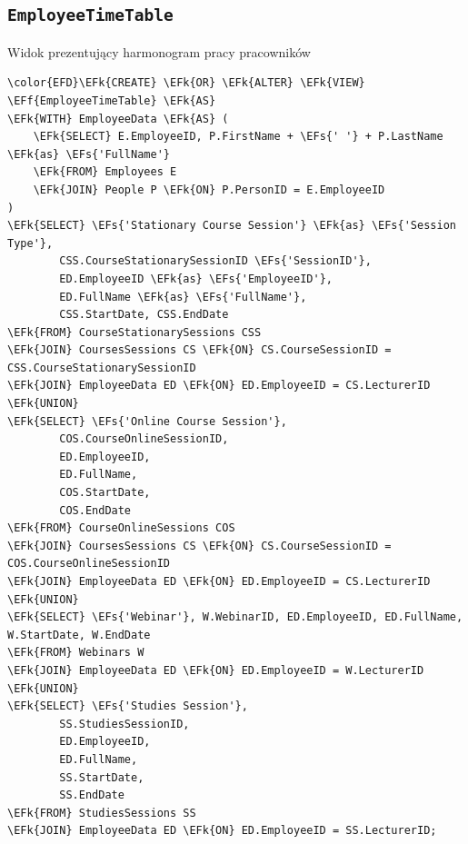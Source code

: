 \documentclass[11pt]{article}
\newcommand{\EFs}[1]{\textcolor{EFs}{#1}} %
\newcommand{\EFk}[1]{\textcolor{EFk}{\textbf{#1}}} %
\newcommand{\EFf}[1]{\textcolor{EFf}{#1}} %
\begin{document}
\subsection{\texttt{EmployeeTimeTable}}
\label{sec:org930ef1b}
Widok prezentujący harmonogram pracy pracowników
\begin{Code}
\begin{Verbatim}
\color{EFD}\EFk{CREATE} \EFk{OR} \EFk{ALTER} \EFk{VIEW} \EFf{EmployeeTimeTable} \EFk{AS}
\EFk{WITH} EmployeeData \EFk{AS} (
    \EFk{SELECT} E.EmployeeID, P.FirstName + \EFs{' '} + P.LastName \EFk{as} \EFs{'FullName'}
    \EFk{FROM} Employees E
    \EFk{JOIN} People P \EFk{ON} P.PersonID = E.EmployeeID
)
\EFk{SELECT} \EFs{'Stationary Course Session'} \EFk{as} \EFs{'Session Type'},
        CSS.CourseStationarySessionID \EFs{'SessionID'},
        ED.EmployeeID \EFk{as} \EFs{'EmployeeID'},
        ED.FullName \EFk{as} \EFs{'FullName'},
        CSS.StartDate, CSS.EndDate
\EFk{FROM} CourseStationarySessions CSS 
\EFk{JOIN} CoursesSessions CS \EFk{ON} CS.CourseSessionID = CSS.CourseStationarySessionID
\EFk{JOIN} EmployeeData ED \EFk{ON} ED.EmployeeID = CS.LecturerID
\EFk{UNION}
\EFk{SELECT} \EFs{'Online Course Session'},
        COS.CourseOnlineSessionID,
        ED.EmployeeID,
        ED.FullName,
        COS.StartDate, 
        COS.EndDate
\EFk{FROM} CourseOnlineSessions COS
\EFk{JOIN} CoursesSessions CS \EFk{ON} CS.CourseSessionID = COS.CourseOnlineSessionID
\EFk{JOIN} EmployeeData ED \EFk{ON} ED.EmployeeID = CS.LecturerID
\EFk{UNION} 
\EFk{SELECT} \EFs{'Webinar'}, W.WebinarID, ED.EmployeeID, ED.FullName, W.StartDate, W.EndDate
\EFk{FROM} Webinars W 
\EFk{JOIN} EmployeeData ED \EFk{ON} ED.EmployeeID = W.LecturerID
\EFk{UNION} 
\EFk{SELECT} \EFs{'Studies Session'},
        SS.StudiesSessionID, 
        ED.EmployeeID, 
        ED.FullName,
        SS.StartDate,
        SS.EndDate
\EFk{FROM} StudiesSessions SS
\EFk{JOIN} EmployeeData ED \EFk{ON} ED.EmployeeID = SS.LecturerID;
\end{Verbatim}
\end{Code}
\end{document}
